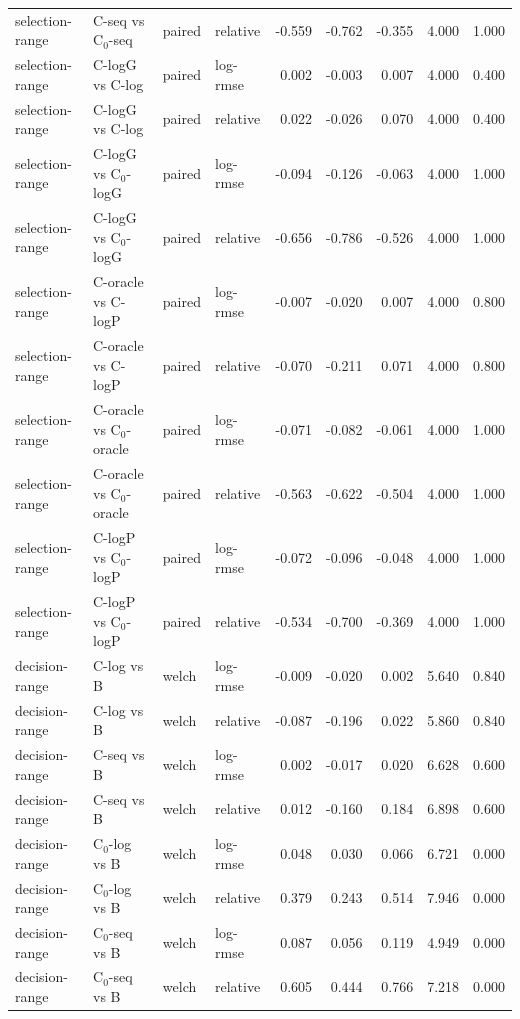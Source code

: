 \begin{longtable}{llllrrrrr}
selection-range & C-seq vs C$_0$-seq & paired & relative & -0.559 & -0.762 & -0.355 & 4.000 & 1.000 \\
selection-range & C-logG vs C-log & paired & log-rmse & 0.002 & -0.003 & 0.007 & 4.000 & 0.400 \\
selection-range & C-logG vs C-log & paired & relative & 0.022 & -0.026 & 0.070 & 4.000 & 0.400 \\
selection-range & C-logG vs C$_0$-logG & paired & log-rmse & -0.094 & -0.126 & -0.063 & 4.000 & 1.000 \\
selection-range & C-logG vs C$_0$-logG & paired & relative & -0.656 & -0.786 & -0.526 & 4.000 & 1.000 \\
selection-range & C-oracle vs C-logP & paired & log-rmse & -0.007 & -0.020 & 0.007 & 4.000 & 0.800 \\
selection-range & C-oracle vs C-logP & paired & relative & -0.070 & -0.211 & 0.071 & 4.000 & 0.800 \\
selection-range & C-oracle vs C$_0$-oracle & paired & log-rmse & -0.071 & -0.082 & -0.061 & 4.000 & 1.000 \\
selection-range & C-oracle vs C$_0$-oracle & paired & relative & -0.563 & -0.622 & -0.504 & 4.000 & 1.000 \\
selection-range & C-logP vs C$_0$-logP & paired & log-rmse & -0.072 & -0.096 & -0.048 & 4.000 & 1.000 \\
selection-range & C-logP vs C$_0$-logP & paired & relative & -0.534 & -0.700 & -0.369 & 4.000 & 1.000 \\
decision-range & C-log vs B & welch & log-rmse & -0.009 & -0.020 & 0.002 & 5.640 & 0.840 \\
decision-range & C-log vs B & welch & relative & -0.087 & -0.196 & 0.022 & 5.860 & 0.840 \\
decision-range & C-seq vs B & welch & log-rmse & 0.002 & -0.017 & 0.020 & 6.628 & 0.600 \\
decision-range & C-seq vs B & welch & relative & 0.012 & -0.160 & 0.184 & 6.898 & 0.600 \\
decision-range & C$_0$-log vs B & welch & log-rmse & 0.048 & 0.030 & 0.066 & 6.721 & 0.000 \\
decision-range & C$_0$-log vs B & welch & relative & 0.379 & 0.243 & 0.514 & 7.946 & 0.000 \\
decision-range & C$_0$-seq vs B & welch & log-rmse & 0.087 & 0.056 & 0.119 & 4.949 & 0.000 \\
decision-range & C$_0$-seq vs B & welch & relative & 0.605 & 0.444 & 0.766 & 7.218 & 0.000 \\

\end{longtable}
